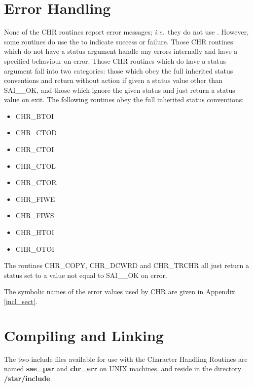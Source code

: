 \documentclass[twoside,11pt,nolof]{starlink}
\begin{document}
\section {Error Handling \label{err_sect} }

None of the CHR routines report error messages; \emph{i.e.}\ they do not use
.
However, some routines do use the
to indicate success or failure.
Those CHR routines which do not have a status argument handle any errors
internally and have a specified behaviour on error.
Those CHR routines which do have a status argument fall into two categories:
those which obey the full inherited status conventions and return without
action if given a status value other than SAI\_\_OK, and those which ignore
the given status and just return a status value on exit.
The following routines obey the full inherited status conventions:

\begin {itemize}
\item CHR\_BTOI
\item CHR\_CTOD
\item CHR\_CTOI
\item CHR\_CTOL
\item CHR\_CTOR
\item CHR\_FIWE
\item CHR\_FIWS
\item CHR\_HTOI
\item CHR\_OTOI
\end {itemize}

The routines CHR\_COPY, CHR\_DCWRD and CHR\_TRCHR all just return a status
set to a value not equal to SAI\_\_OK on error.

The symbolic names of the error values used by CHR are given in Appendix
\ref{incl_sect}.


\section {Compiling and Linking \label{compile_sect}}
The two include files available for use with the Character Handling Routines
are named \textbf{sae\_par} and \textbf{chr\_err} on UNIX
machines, and reside in the directory \textbf{/star/include}.
\end{document}

